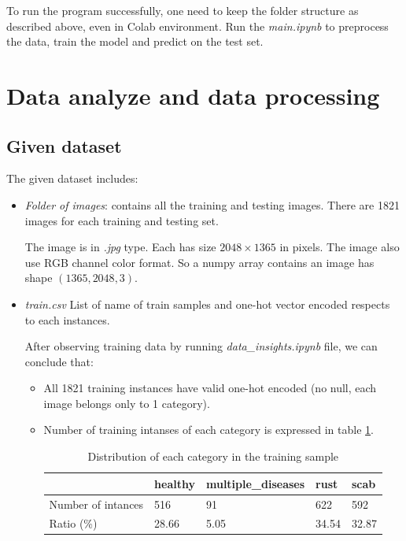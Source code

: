 \documentclass[12pt, a4paper]{article}
\begin{document}
	To run the program successfully, one need to keep the folder structure as described above, even in Colab environment. Run the \emph{main.ipynb} to preprocess the data, train the model and predict on the test set.

	\section{Data analyze and data processing}
	
	\subsection{Given dataset}
	
	The given dataset includes:
	
	\begin{itemize}
		\item \emph{Folder of images}: contains all the training and testing images. There are 1821 images for each training and testing set.
		
		The image is in \emph{.jpg} type. Each has size $2048 \times 1365$ in pixels. The image also use RGB channel color format. So a numpy array contains an image has shape $(1365, 2048, 3)$.
		
		\item \emph{train.csv} List of name of train samples and one-hot vector encoded respects to each instances.
		
		After observing training data by running \emph{data\_insights.ipynb} file, we can conclude that:
		
		\begin{itemize}
		\item All 1821 training instances have valid one-hot encoded (no null, each image belongs only to 1 category).	
		\item Number of training intanses of each category is expressed in table \ref{tab:distribute_train}.
		
		\begin{table}[]
		\centering
		\begin{tabular}{@{}lllll@{}}
		\toprule
		\textbf{}          & \textbf{healthy} & \textbf{multiple\_diseases} & \textbf{rust} & \textbf{scab} \\ \midrule
		Number of intances & 516              & 91                          & 622           & 592           \\
		Ratio (\%)         & 28.66            & 5.05                        & 34.54         & 32.87         \\ \bottomrule
		\end{tabular}
		\caption{Distribution of each category in the training sample}
		\label{tab:distribute_train}
		\end{table}
		

\end{itemize}
\end{itemize}
\end{document}
